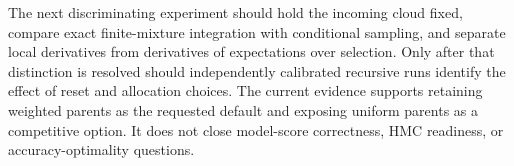The next discriminating experiment should hold the incoming cloud fixed,
compare exact finite-mixture integration with conditional sampling, and
separate local derivatives from derivatives of expectations over selection.
Only after that distinction is resolved should independently calibrated
recursive runs identify the effect of reset and allocation choices. The
current evidence supports retaining weighted parents as the requested
default and exposing uniform parents as a competitive option. It does not
close model-score correctness, HMC readiness, or accuracy-optimality questions.
